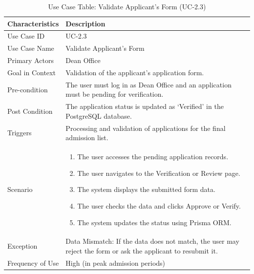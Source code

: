 \begin{table}[H]
    \centering
    \small
    \renewcommand{\arraystretch}{1.4}
    \caption{Use Case Table: Validate Applicant’s Form (UC-2.3)}
    \label{tab:dean_validate_form}
    
    \begin{tabularx}{\textwidth}{|l|X|}
        \hline
        \rowcolor[gray]{0.9} {Characteristics} & {Description} \\ \hline
        Use Case ID & UC-2.3 \\ \hline
        Use Case Name & Validate Applicant’s Form \\ \hline
        Primary Actors & Dean Office \\ \hline
        Goal in Context & Validation of the applicant’s application form. \\ \hline
        Pre-condition & The user must log in as Dean Office and an application must be pending for verification. \\ \hline
        Post Condition & The application status is updated as `Verified' in the PostgreSQL database. \\ \hline
        Triggers & Processing and validation of applications for the final admission list. \\ \hline
        Scenario & 
        \begin{enumerate}[nosep, leftmargin=*]
            \item The user accesses the pending application records.
            \item The user navigates to the {Verification} or {Review} page.
            \item The system displays the submitted form data.
            \item The user checks the data and clicks {Approve} or {Verify}.
            \item The system updates the status using Prisma ORM.
        \end{enumerate} \\ \hline
        Exception & Data Mismatch: If the data does not match, the user may reject the form or ask the applicant to resubmit it. \\ \hline
        Frequency of Use & High (in peak admission periods) \\ \hline
    \end{tabularx}
\end{table}
\FloatBarrier